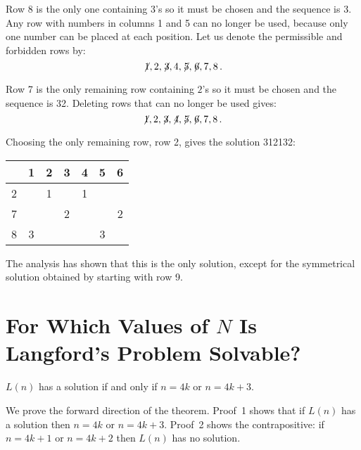 Row 8 is the only one containing $3$'s so it must be chosen and the sequence is 3\textvisiblespace \textvisiblespace {}\textvisiblespace. Any row with numbers in columns 1 and 5 can no longer be used, because only one number can be placed at each position. Let us denote the permissible and forbidden rows by:
\[\not\! 1,2,\not\! 3,4,\not\! 5, \not\! 6, 7, 8\,.\]

Row 7 is the only remaining row containing $2$'s so it must be chosen and the sequence is 32. Deleting rows that can no longer be used gives:
\[\not\! 1,2,\not\! 3,\not\! 4,\not\! 5, \not\! 6, 7, 8\,.\]

Choosing the only remaining row, row 2, gives the solution 3{}1{}2{}1{}3{}2:
\begin{center}
\addtolength{\tabcolsep}{4pt}
\begin{tabular}{|c||c|c|c|c|c|c|}
\hline
&1&2&3&4&5&6\\\hline\hline
2&&1&&1&&\\\hline
7&&&2&&&2\\\hline
8&3&&&&3&\\\hline
\end{tabular}
\end{center}
The analysis has shown that this is the only solution, except for the symmetrical solution obtained by starting with row 9.

\section{For Which Values of $N$ Is Langford's Problem Solvable?}\label{s.langford-theorem}

\begin{theorem} \label{thm.langford}
$L(n)$ has a solution if and only if $n=4k$ or $n=4k+3$.
\end{theorem}

We prove the forward direction of the theorem. Proof~1 shows that if $L(n)$ has a solution then $n=4k$ or $n=4k+3$. Proof~2 shows the contrapositive: if $n=4k+1$ or $n=4k+2$ then $L(n)$ has no solution.

